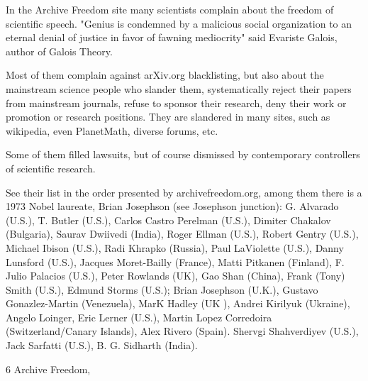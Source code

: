 \documentclass[12pt]{article}
\begin{document}
In the Archive Freedom site many scientists complain about the freedom of scientific speech.
\newline "Genius is condemned by a malicious social organization 
to an eternal denial of justice in favor of fawning mediocrity"
 said Evariste Galois, author of Galois Theory.

Most of them complain against arXiv.org blacklisting, but also about the mainstream science people who slander them, systematically reject their papers from mainstream journals, refuse to sponsor their research, deny their work or promotion or research positions.
\newline They are slandered in many sites, such as wikipedia, even PlanetMath, diverse forums, etc.

Some of them filled lawsuits, but of course dismissed by contemporary controllers of scientific research.

See their list in the order presented by archivefreedom.org, among them there is a 1973 Nobel laureate, Brian Josephson (see Josephson junction): 
G. Alvarado (U.S.), T. Butler (U.S.), Carlos Castro Perelman (U.S.),  Dimiter Chakalov (Bulgaria), Saurav Dwiivedi (India), Roger Ellman (U.S.), Robert Gentry  (U.S.),  Michael Ibison  (U.S.),  Radi Khrapko (Russia), Paul LaViolette  (U.S.),  Danny Lunsford (U.S.), Jacques Moret-Bailly (France), Matti Pitkanen  (Finland), F. Julio Palacios (U.S.), Peter Rowlands  (UK), Gao Shan  (China), Frank (Tony) Smith  (U.S.), Edmund Storms  (U.S.);  Brian Josephson (U.K.), Gustavo Gonazlez-Martin  (Venezuela), MarK Hadley (UK ), Andrei Kirilyuk  (Ukraine), Angelo Loinger,  Eric Lerner  (U.S.), Martin Lopez Corredoira (Switzerland/Canary Islands), Alex Rivero  (Spain). Shervgi Shahverdiyev  (U.S.), Jack Sarfatti  (U.S.), B. G. Sidharth  (India). 


\begin{thebibliography} {6}
 Archive Freedom, 
\end{thebibliography}
\end{document}
